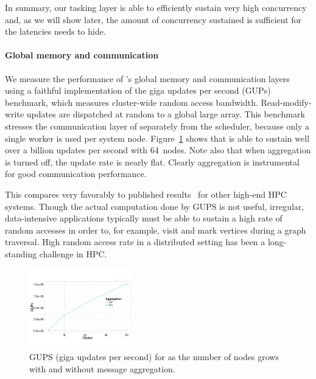 In summary, our tasking layer is able to efficiently sustain very high
concurrency and, as we will show later, the amount of concurrency sustained is
sufficient for the latencies \Grappa needs to hide.

\paragraph{Global memory and communication} We measure the performance of
\Grappa's global memory and communication layers using a faithful
implementation of the giga updates per second (GUPs) benchmark, which
measures cluster-wide random access bandwidth.  Read-modify-write
updates are dispatched at random to a global large array. This benchmark
stresses the communication layer of \Grappa separately from the
scheduler, because only a single worker is used per system node.
Figure~\ref{fig:grappa-gups} shows that \Grappa is able to sustain
well over a billion updates per second with 64~nodes. Note also that
when aggregation is turned off, the update rate is nearly
flat. Clearly aggregation is instrumental for good communication
performance.

This compares very favorably to published results~\cite{gups} for other
high-end HPC systems. Though the actual computation done by GUPS is not 
useful, irregular, data-intensive applications typically must be able to
sustain a high rate of random accesses in order to, for example, visit and
mark vertices during a graph traversal. High random access rate in a
distributed setting has been a long-standing challenge in HPC.

\begin{figure}[ht]
    \begin{center}
      \includegraphics[width=0.4\textwidth]{figs/gups.pdf}
    \end{center}
    \caption{GUPS (giga updates per second) for \Grappa as the number of nodes grows with and without message aggregation.}
    \label{fig:grappa-gups}
\end{figure}



